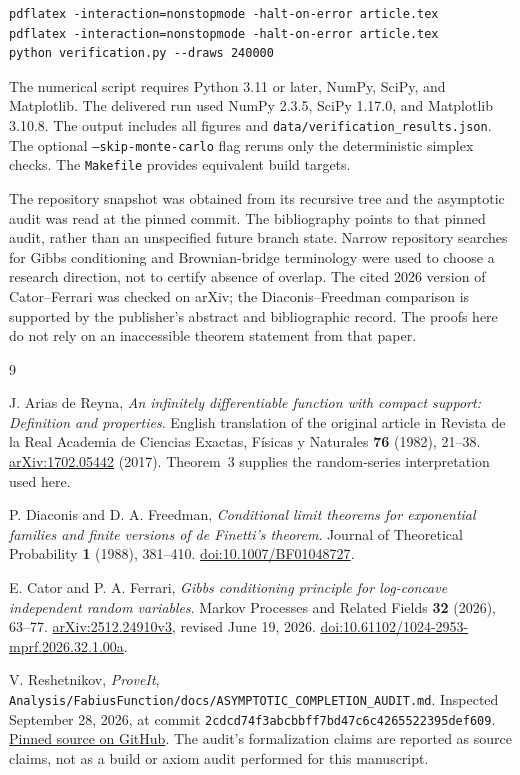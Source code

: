 \documentclass[11pt,letterpaper]{article}
\numberwithin{equation}{section}
\theoremstyle{definition}
\theoremstyle{remark}
\begin{document}
\begin{verbatim}
pdflatex -interaction=nonstopmode -halt-on-error article.tex
pdflatex -interaction=nonstopmode -halt-on-error article.tex
python verification.py --draws 240000
\end{verbatim}

The numerical script requires Python 3.11 or later, NumPy, SciPy, and
Matplotlib. The delivered run used NumPy 2.3.5, SciPy 1.17.0, and
Matplotlib 3.10.8. The output includes all figures and
\texttt{data/verification\_results.json}. The optional
\texttt{--skip-monte-carlo} flag reruns only the deterministic simplex checks.
The \texttt{Makefile} provides equivalent build targets.

The repository snapshot was obtained from its recursive tree and the
asymptotic audit was read at the pinned commit. The bibliography points to
that pinned audit, rather than an unspecified future branch state. Narrow
repository searches for Gibbs conditioning and Brownian-bridge terminology
were used to choose a research direction, not to certify absence of overlap.
The cited 2026 version of Cator--Ferrari was checked on arXiv; the
Diaconis--Freedman comparison is supported by the publisher's abstract and
bibliographic record. The proofs here do not rely on an inaccessible theorem
statement from that paper.

\begin{thebibliography}{9}

J. Arias de Reyna,
\emph{An infinitely differentiable function with compact support:
Definition and properties}.
English translation of the original article in
Revista de la Real Academia de Ciencias Exactas, F\'isicas y Naturales
\textbf{76} (1982), 21--38.
\href{https://arxiv.org/abs/1702.05442}{arXiv:1702.05442} (2017).
Theorem~3 supplies the random-series interpretation used here.

P. Diaconis and D. A. Freedman,
\emph{Conditional limit theorems for exponential families and finite versions
of de Finetti's theorem}.
Journal of Theoretical Probability \textbf{1} (1988), 381--410.
\href{https://doi.org/10.1007/BF01048727}{doi:10.1007/BF01048727}.

E. Cator and P. A. Ferrari,
\emph{Gibbs conditioning principle for log-concave independent random variables}.
Markov Processes and Related Fields \textbf{32} (2026), 63--77.
\href{https://arxiv.org/abs/2512.24910v3}{arXiv:2512.24910v3},
revised June 19, 2026.
\href{https://doi.org/10.61102/1024-2953-mprf.2026.32.1.00a}
{doi:10.61102/1024-2953-mprf.2026.32.1.00a}.

V. Reshetnikov, \emph{ProveIt},
\texttt{Analysis/FabiusFunction/docs/ASYMPTOTIC\_COMPLETION\_AUDIT.md}.
Inspected September 28, 2026, at commit
{\small\texttt{2cdcd74f3abcbbff7bd47c6c4265522395def609}}.
\href{https://github.com/VladimirReshetnikov/ProveIt/blob/2cdcd74f3abcbbff7bd47c6c4265522395def609/Analysis/FabiusFunction/docs/ASYMPTOTIC_COMPLETION_AUDIT.md}
{Pinned source on GitHub}.
The audit's formalization claims are reported as source claims, not as a
build or axiom audit performed for this manuscript.

\end{thebibliography}
\end{document}

